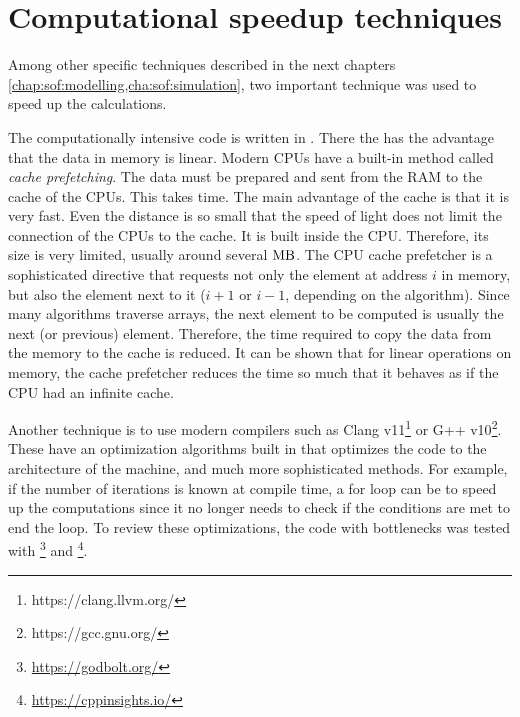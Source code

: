 \section{Computational speedup techniques}\label{sec:theorySpeedup}
%
Among other specific techniques described in the next chapters \cref{chap:sof:modelling,cha:sof:simulation}, two important technique was used to speed up the calculations.
\par
%
The computationally intensive code is written in \cpp{}.
There the  has the advantage that the data in memory is linear.
Modern \acp{CPU} have a built-in method called \textit{cache prefetching}.
The data must be prepared and sent from the \ac{RAM} to the cache of the \acp{CPU}.
This takes time.
The main advantage of the cache is that it is very fast.
Even the distance is so small that the speed of light does not limit the connection of the \acp{CPU} to the cache.
It is built inside the \ac{CPU}.
Therefore, its size is very limited, usually around several $\si{\mega\byte}$.
The \ac{CPU} cache prefetcher is a sophisticated directive that requests not only the element at address $i$ in memory, but also the element next to it ($i+1$ or $i-1$, depending on the algorithm).
Since many algorithms traverse arrays, the next element to be computed is usually the next (or previous) element.
Therefore, the time required to copy the data from the memory to the cache is reduced.
It can be shown that for linear operations on memory, the cache prefetcher reduces the time so much that it behaves as if the \ac{CPU} had an infinite cache.
\par
%
Another technique is to use modern compilers such as Clang v11\footnote{https://clang.llvm.org/} or G++ v10\footnote{https://gcc.gnu.org/}.
These have an optimization algorithms built in that optimizes the code to the architecture of the machine, and much more sophisticated methods.
For example, if the number of iterations is known at compile time, a for loop can be  to speed up the computations since it no longer needs to check if the conditions are met to end the loop.
To review these optimizations, the code with bottlenecks was tested with \footnote{\url{https://godbolt.org/}} and \footnote{\url{https://cppinsights.io/}}.
%